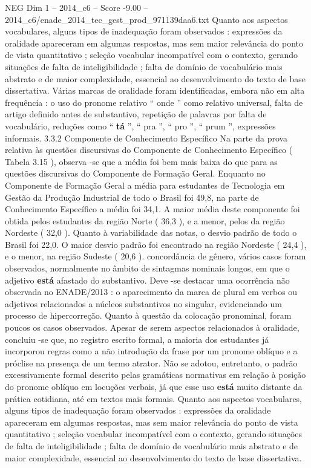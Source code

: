 \begin{textsample}{NEG Dim 1 – 2014\_c6 – Score -9.00 – 2014\_c6/enade\_2014\_tec\_gest\_prod\_971139daa6.txt}
Quanto aos aspectos vocabulares, alguns tipos de inadequação foram observados : expressões da oralidade apareceram em algumas respostas, mas sem maior relevância do ponto de vista quantitativo ; seleção vocabular incompatível com o contexto, gerando situações de falta de inteligibilidade ; falta de domínio de vocabulário mais abstrato e de maior complexidade, essencial ao desenvolvimento do texto de base dissertativa.
Várias marcas de oralidade foram identificadas, embora não em alta frequência : o uso do pronome relativo “ onde ” como relativo universal, falta de artigo definido antes de substantivo, repetição de palavras por falta de vocabulário, reduções como “ \textbf{tá} ”, “ pra ”, “ pro ”, “ prum ”, expressões informais. 3.3.2 Componente de Conhecimento Específico Na parte da prova relativa às questões discursivas do Componente de Conhecimento Específico ( Tabela 3.15 ), observa -se que a média foi bem mais baixa do que para as questões discursivas do Componente de Formação Geral.
Enquanto no Componente de Formação Geral a média para estudantes de Tecnologia em Gestão da Produção Industrial de todo o Brasil foi 49,8, na parte de Conhecimento Específico a média foi 34,1.
A maior média deste componente foi obtida pelos estudantes da região Norte ( 36,3 ), e a menor, pelos da região Nordeste ( 32,0 ).
Quanto à variabilidade das notas, o desvio padrão de todo o Brasil foi 22,0.
O maior desvio padrão foi encontrado na região Nordeste ( 24,4 ), e o menor, na região Sudeste ( 20,6 ). concordância de gênero, vários casos foram observados, normalmente no âmbito de sintagmas nominais longos, em que o adjetivo \textbf{está} afastado do substantivo.
Deve -se destacar uma ocorrência não observada no ENADE/2013 : o aparecimento da marca de plural em verbos ou adjetivos relacionados a núcleos substantivos no singular, evidenciando um processo de hipercorreção.
Quanto à questão da colocação pronominal, foram poucos os casos observados.
Apesar de serem aspectos relacionados à oralidade, concluiu -se que, no registro escrito formal, a maioria dos estudantes já incorporou regras como a não introdução da frase por um pronome oblíquo e a próclise na presença de um termo atrator.
Não se adotou, entretanto, o padrão excessivamente formal descrito pelas gramáticas normativas em relação à posição do pronome oblíquo em locuções verbais, já que esse uso \textbf{está} muito distante da prática cotidiana, até em textos mais formais.
Quanto aos aspectos vocabulares, alguns tipos de inadequação foram observados : expressões da oralidade apareceram em algumas respostas, mas sem maior relevância do ponto de vista quantitativo ; seleção vocabular incompatível com o contexto, gerando situações de falta de inteligibilidade ; falta de domínio de vocabulário mais abstrato e de maior complexidade, essencial ao desenvolvimento do texto de base dissertativa.

\end{textsample}
